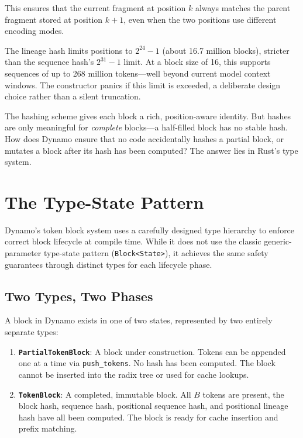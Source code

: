 This ensures that the current fragment at position $k$ always matches the parent fragment stored at position $k + 1$, even when the two positions use different encoding modes.

\begin{notebox}
The lineage hash limits positions to $2^{24} - 1$ (about 16.7 million blocks), stricter than the sequence hash's $2^{31} - 1$ limit. At a block size of 16, this supports sequences of up to 268 million tokens---well beyond current model context windows. The constructor panics if this limit is exceeded, a deliberate design choice rather than a silent truncation.
\end{notebox}

\medskip
The hashing scheme gives each block a rich, position-aware identity. But hashes are only meaningful for \emph{complete} blocks---a half-filled block has no stable hash. How does Dynamo ensure that no code accidentally hashes a partial block, or mutates a block after its hash has been computed? The answer lies in Rust's type system.

\section{The Type-State Pattern}
\label{sec:tokens:typestate}

%
Dynamo's token block system uses a carefully designed type hierarchy to enforce correct block lifecycle at compile time. While it does not use the classic generic-parameter type-state pattern (\texttt{Block<State>}), it achieves the same safety guarantees through distinct types for each lifecycle phase.

\subsection{Two Types, Two Phases}

A block in Dynamo exists in one of two states, represented by two entirely separate types:

\begin{enumerate}
  \item \textbf{\texttt{PartialTokenBlock}}: A block under construction. Tokens can be appended one at a time via \texttt{push\_tokens}. No hash has been computed. The block cannot be inserted into the radix tree or used for cache lookups.
  \item \textbf{\texttt{TokenBlock}}: A completed, immutable block. All $B$ tokens are present, the block hash, sequence hash, positional sequence hash, and positional lineage hash have all been computed. The block is ready for cache insertion and prefix matching.
\end{enumerate}


